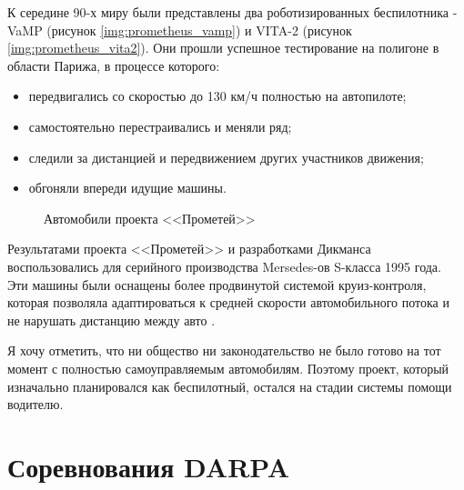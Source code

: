 К середине 90-х миру были представлены два роботизированных беспилотника - 
VaMP (рисунок \ref{img:prometheus_vamp}) и VITA-2
(рисунок \ref{img:prometheus_vita2}). Они прошли успешное тестирование на 
полигоне в области Парижа, в процессе которого:

\begin{itemize}
  \item передвигались со скоростью до 130 км/ч полностью на автопилоте;
  \item самостоятельно перестраивались и меняли ряд;
  \item следили за дистанцией и передвижением других участников движения;
  \item обгоняли впереди идущие машины.
\end{itemize}

\begin{figure}[ht]
  {\centering
      \hfill
      \hfill
      \hfill
  }
  \caption{Автомобили проекта <<Прометей>>}
  \label{img:prometheus}
\end{figure}

Результатами проекта <<Прометей>> и разработками Дикманса воспользовались для 
серийного производства Mersedes-ов S-класса 1995 года. Эти машины были 
оснащены более продвинутой системой круиз-контроля, которая позволяла 
адаптироваться к средней скорости автомобильного потока и не нарушать дистанцию 
между авто \cite{MADI_GAZ}.

Я хочу отметить, что ни общество ни законодательство не было готово на тот 
момент с полностью самоуправляемым автомобилям. Поэтому проект, который изначально
планировался как беспилотный, остался на стадии системы помощи водителю.





\section{Соревнования DARPA} \label{sect_DARPA}

